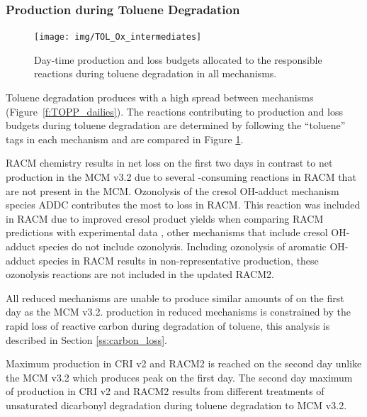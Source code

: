\subsubsection[Ox Production during Toluene Degradation]{ Production during Toluene Degradation} \label{sss:aromatic}

\begin{figure}
    \centering
    \texttt{[image: img/TOL\_Ox\_intermediates]}
    \vspace{0mm}
    \caption{Day-time  production and loss budgets allocated to the responsible reactions during toluene degradation in all mechanisms.}
    \vspace{-4mm}
    \label{f:toluene_Ox}
\end{figure}

Toluene degradation produces  with a high spread between mechanisms (\mbox{Figure \ref{f:TOPP_dailies}}).
The reactions contributing to  production and loss budgets during toluene degradation are determined by following the ``toluene'' tags in each mechanism and are compared in Figure \ref{f:toluene_Ox}.

RACM chemistry results in net  loss on the first two days in contrast to net  production in the MCM v3.2 due to several -consuming reactions in RACM that are not present in the MCM.
Ozonolysis of the cresol OH-adduct mechanism species ADDC contributes the most to  loss in RACM.
This reaction was included in RACM due to improved cresol product yields when comparing RACM predictions with experimental data \citep{Stockwell:1997}, other mechanisms that include cresol OH-adduct species do not include ozonolysis.
Including ozonolysis of aromatic OH-adduct species in RACM results in non-representative  production, these ozonolysis reactions are not included in the updated RACM2.

All reduced mechanisms are unable to produce similar amounts of  on the first day as the MCM v3.2.
 production in reduced mechanisms is constrained by the rapid loss of reactive carbon during degradation of toluene, this analysis is described in Section \ref{ss:carbon_loss}.

Maximum  production in CRI v2 and RACM2 is reached on the second day unlike the MCM v3.2 which produces peak  on the first day.
The second day maximum of  production in CRI v2 and RACM2 results from different treatments of unsaturated dicarbonyl degradation during toluene degradation to MCM v3.2.

